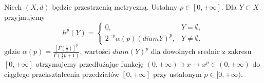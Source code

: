 \begin{defi}
	Niech $(X, d)$ będzie przestrzenią metryczną. Ustalmy $p \in [0, +\infty]$. Dla $Y \subset X$ przyjmujemy 
	$$
		h^p(Y) = 
		\begin{cases}
			0, & Y = \emptyset, \\
			2^{-p}\alpha(p)(diam Y)^p, & Y \neq \emptyset.
		\end{cases}
	$$ gdzie $\alpha(p) = \frac{[\Gamma(\frac{1}{2})]^p}{\Gamma(\frac{1}{2}p + 1)}$, wartości $diam(Y)^p$ dla dowolnych srednic z zakresu $[0, +\infty]$ otrzymujemy przedłużając funkcję $(0, +\infty) \ni x \rightarrow x^p \in (0, +\infty)$ do ciągłego przekształcenia przedziałów $[0, +\infty]$ przy ustalonym $p \in [0, +\infty)$.
\end{defi}